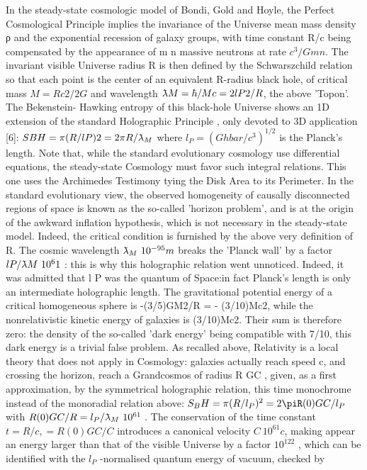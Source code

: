 In the steady-state cosmologic model of Bondi, Gold and Hoyle, the Perfect Cosmological
Principle implies the invariance of the Universe mean mass density ρ and the exponential recession
of galaxy groups, with time constant R/c being compensated by the appearance of m n massive
neutrons at rate $c^3 /Gm n $. The invariant visible Universe radius R is then defined by the
Schwarszchild relation so that each point is the center of an equivalent R-radius black hole, of
critical mass $M = Rc 2 /2G$ and wavelength $\lambdabar M = \hbar/Mc = 2l P2 /R$, the above 'Topon'. The Bekenstein-
Hawking entropy of this black-hole Universe shows an 1D extension of the standard Holographic
Principle , only devoted to 3D application [6]:
$S BH = \pi(R/l P )2 = 2\pi R/\lambdabar_M$
where $l_P = (Ghbar/c^3 )^{1/2}$ is the Planck's length. Note that, while the standard evolutionary cosmology
use differential equations, the steady-state Cosmology must favor such integral relations. This one
uses the Archimedes Testimony tying the Disk Area to its Perimeter.
In the standard evolutionary view, the observed homogeneity of causally disconnected regions
of space is known as the so-called 'horizon problem', and is at the origin of the awkward inflation
hypothesis, which is not necessary in the steady-state model. Indeed, the critical condition is
furnished by the above very definition of R.
The cosmic wavelength $\lambdabar_M ~ 10^{-95} m$ breaks the 'Planck wall' by a factor $l P /\lambdabar M ~ 10^61$ : this is why this holographic relation went unnoticed. Indeed, it was admitted that l P was the quantum of Space:in fact Planck's length is only an intermediate holographic length.
The gravitational potential energy of a critical homogeneous sphere is -(3/5)GM2/R = -
(3/10)Mc2, while the nonrelativistic kinetic energy of galaxies is (3/10)Mc2. Their sum is therefore
zero: the density of the so-called 'dark energy' being compatible with 7/10, this dark energy is a
trivial false problem. As recalled above, Relativity is a local theory that does not apply in
Cosmology: galaxies actually reach speed c, and crossing the horizon, reach a Grandcosmos of
radius R GC , given, as a first approximation, by the symmetrical holographic relation, this time
monochrome instead of the monoradial relation above:
$S_BH = \pi(R/l_P )^{2} = 2\piR (0) GC /l_P$
with $R (0) GC /R = l_P /\lambdabar_M ~ 10^{61}$ . The conservation of the time constant $t = R/c, = R (0) GC /C$ introduces a canonical velocity $C ~ 10^{61} c$, making appear an energy larger than that of the visible Universe by a
factor $10^{122}$ , which can be identified with the $l_P$ -normalised quantum energy of vacuum, checked by
